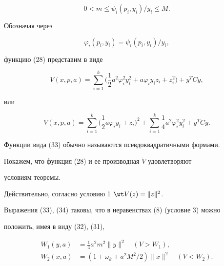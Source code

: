 \begin{equation} 


0<m\le\psi_i(p_i,y_i)/y_i\le M. 


\end{equation} 


Обозначая через 


\begin{equation} 


\varphi_i(p_i,y_i)=\psi_i(p_i,y_i)/y_i, 


\end{equation} 


функцию (28) представим в виде 


\begin{equation} 


V(x,p,a)=\sum^k_{i=1}\biggl(\frac{1}{2}a^2\varphi^2_i y^2_i+a\varphi_i 


y_i z_i+z^2_i\biggr)+y^T C y,


\end{equation} 


или


\begin{equation} 


V(x,p,a)=\sum^k_{i=1}\biggl(\frac{1}{2}a\varphi_i y_i+z_i 


\biggr)^2+\sum^k_{i=1}\frac{1}{4}a^2\varphi^2_i y^2_i+ 


y^T C y. 


\end{equation} 


Функции вида (33) обычно называются псевдоквадратичными формами. 


 


Покажем, что функция (28) и ее производная $\Dot V$ удовлетворяют 


условиям теоремы. 


Действительно, согласно условию 1\; $\wt V(z)=\|z\|^2$. 


Выражения (33), (34) таковы, что в неравенствах (8) (условие 3) можно  


положить, имея в виду (32), (31), 


\begin{equation} 


\begin{split} 


W_1(y,a)&=\frac{1}{4}a^2m^2\|y\|^2\quad (V>W_1),\\ 


W_2(x,a)&=(1+\omega_k+a^2M^2/2)\|x\|^2\quad (V<W_2). 


\end{split} 


\end{equation} 



